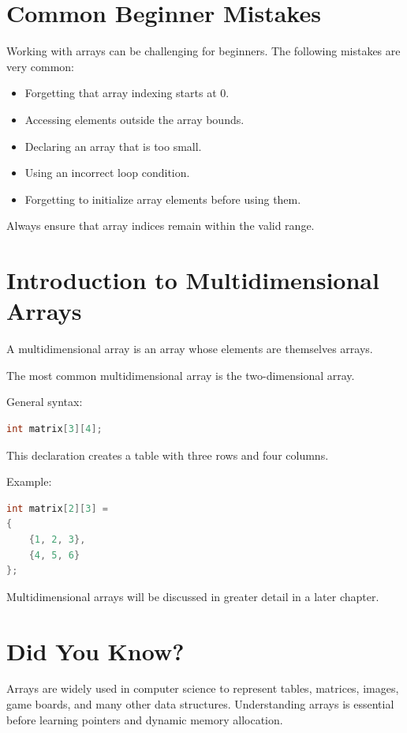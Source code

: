 \documentclass[12pt,openany]{book}
\begin{document}
\section{Common Beginner Mistakes}

Working with arrays can be challenging for beginners. The following mistakes are very common:

\begin{itemize}
    \item Forgetting that array indexing starts at 0.
    \item Accessing elements outside the array bounds.
    \item Declaring an array that is too small.
    \item Using an incorrect loop condition.
    \item Forgetting to initialize array elements before using them.
\end{itemize}

Always ensure that array indices remain within the valid range.

\section{Introduction to Multidimensional Arrays}

A multidimensional array is an array whose elements are themselves arrays.

The most common multidimensional array is the two-dimensional array.

General syntax:

\begin{lstlisting}[language=C]
int matrix[3][4];
\end{lstlisting}

This declaration creates a table with three rows and four columns.

Example:

\begin{lstlisting}[language=C]
int matrix[2][3] =
{
    {1, 2, 3},
    {4, 5, 6}
};
\end{lstlisting}

Multidimensional arrays will be discussed in greater detail in a later chapter.

\section{Did You Know?}

Arrays are widely used in computer science to represent tables, matrices, images, game boards, and many other data structures. Understanding arrays is essential before learning pointers and dynamic memory allocation.
\end{document}
